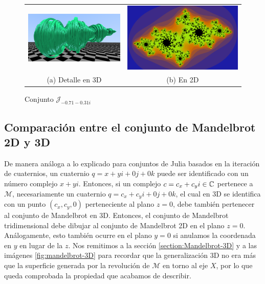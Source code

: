 \begin{figure}[ht]
    \centering
    \begin{tabular}{cc}
        \includegraphics[scale=0.42]{img/C9/julia-3D-oblicuo-2.png} &
        \includegraphics[scale=0.28]{img/C9/julia-2D-2.png} \\
          
    (a) Detalle en 3D & (b) En 2D  \\
    \end{tabular}
    \caption{Conjunto $\mathcal{J}_{-0.71-0.31i}$}
    \label{fig:julia-2D-3D-2}
\end{figure}

\subsection{Comparación entre el conjunto de Mandelbrot 2D y 3D}

De manera análoga a lo explicado para conjuntos de Julia basados en la iteración de cuaternios, un cuaternio $q=x+yi+0j+0k$ puede ser identificado con un número complejo $x+yi$. Entonces, si un complejo $c=c_x+c_yi\in\mathbb{C}$ pertenece a $\mathcal{M}$, necesariamente un cuaternio $q=c_x+c_yi+0j+0k$, el cual en 3D se identifica con un punto $(c_x,c_y,0)$ perteneciente al plano $z=0$, debe también pertenecer al conjunto de Mandelbrot en 3D. Entonces, el conjunto de Mandelbrot tridimensional debe dibujar al conjunto de Mandelbrot 2D en el plano $z=0$. Análogamente, esto también ocurre en el plano $y=0$ si anulamos la coordenada en $y$ en lugar de la $z$. Nos remitimos a la sección \ref{section:Mandelbrot-3D} y a las imágenes \ref{fig:mandelbrot-3D} para recordar que la generalización 3D no era más que la superficie generada por la revolución de $\mathcal{M}$ en torno al eje $X$, por lo que queda comprobada la propiedad que acabamos de describir.

